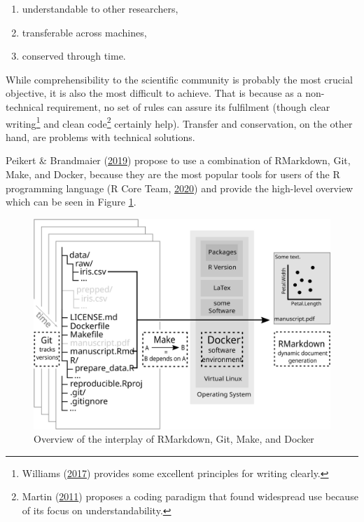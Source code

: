 \documentclass[12pt,a4paper,]{article}
\providecommand{\tightlist}{%
  \setlength{\itemsep}{0pt}\setlength{\parskip}{0pt}}
\begin{document}
\begin{enumerate}
\def\labelenumi{\arabic{enumi}.}
\tightlist
\item
  understandable to other researchers,
\item
  transferable across machines,
\item
  conserved through time.
\end{enumerate}

While comprehensibility to the scientific community is probably the most crucial objective, it is also the most difficult to achieve.
That is because as a non-technical requirement, no set of rules can assure its fulfilment (though clear writing\footnote{Williams (\protect\hyperlink{ref-williamsStyleLessonsClarity2017}{2017}) provides some excellent principles for writing clearly.} and clean code\footnote{Martin (\protect\hyperlink{ref-martinCleanCoderCode2011}{2011}) proposes a coding paradigm that found widespread use because of its focus on understandability.} certainly help).
Transfer and conservation, on the other hand, are problems with technical solutions.

Peikert \& Brandmaier (\protect\hyperlink{ref-peikertReproducibleDataAnalysis2019}{2019}) propose to use a combination of RMarkdown, Git, Make, and Docker, because they are the most popular tools for users of the R programming language (R Core Team, \protect\hyperlink{ref-R-base}{2020}) and provide the high-level overview which can be seen in Figure \ref{fig:nutshell}.

\begin{figure}

{\centering \includegraphics[width=1\linewidth]{images/nutshell} 

}

\caption{Overview of the interplay of RMarkdown, Git, Make, and Docker}\label{fig:nutshell}
\end{figure}
\end{document}

